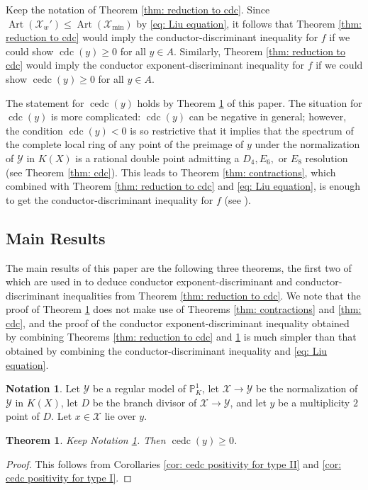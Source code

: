 \documentclass[12pt]{amsart}
\numberwithin{equation}{section}
\newtheorem{theorem}[equation]{Theorem}
\theoremstyle{definition}
\newtheorem{notation}[equation]{Notation}
\renewcommand{\P}{\mathbb P}
\newcommand{\X}{\mathcal{X}}
\newcommand{\Y}{\mathcal{Y}}
\DeclareMathOperator{\Art}{Art}
\DeclareMathOperator{\cdc}{cdc}
\DeclareMathOperator{\cedc}{cedc}
\begin{document}
Keep the notation of Theorem \ref{thm: reduction to cdc}. Since $\Art(\X_w')\leq\Art(\X_{\min})$ by \eqref{eq: Liu equation}, it follows that Theorem \ref{thm: reduction to cdc} would imply the conductor-discriminant inequality for $f$ if we could show $\cdc(y)\geq0$ for all $y\in A$. Similarly,  Theorem \ref{thm: reduction to cdc} would imply the conductor exponent-discriminant inequality for $f$ if we could show $\cedc(y)\geq0$ for all $y\in A$.

The statement for $\cedc(y)$ holds by Theorem \ref{thm: cedc} of this paper. The situation for $\cdc(y)$ is more complicated: $\cdc(y)$ can be negative in general; however, the condition $\cdc(y)<0$ is so restrictive that it implies that the spectrum of the complete local ring of any point of the preimage of $y$ under the normalization of $\Y$ in $K(X)$ is a rational double point admitting a $D_4,E_6,$ or $E_8$ resolution (see Theorem \ref{thm: cdc}). This leads to Theorem \ref{thm: contractions}, which combined with Theorem \ref{thm: reduction to cdc} and \eqref{eq: Liu equation}, is enough to get the conductor-discriminant inequality for $f$ (see \cite[Proposition 10.19 and Corollary 10.20]{Part1}).

\subsection{Main Results}\hfill

The main results of this paper are the following three theorems, the first two of which are used in \cite{Part1} to deduce conductor exponent-discriminant and conductor-discriminant inequalities from Theorem \ref{thm: reduction to cdc}. We note that the proof of Theorem \ref{thm: cedc} does not make use of Theorems \ref{thm: contractions} and \ref{thm: cdc}, and the proof of the conductor exponent-discriminant inequality obtained by combining Theorems \ref{thm: reduction to cdc} and \ref{thm: cedc} is much simpler than that obtained by combining the conductor-discriminant inequality and \eqref{eq: Liu equation}.

\begin{notation}\label{notation: intro notation}
    Let $\Y$ be a regular model of $\P^1_K$, let $\X\to\Y$ be the normalization of $\Y$ in $K(X)$, let $D$ be the branch divisor of $\X\to\Y$, and let $y$ be a multiplicity $2$ point of $D$. Let $x\in\X$ lie over $y$.
\end{notation}

\begin{theorem}\label{thm: cedc}
    Keep Notation \ref{notation: intro notation}. Then $\cedc(y)\geq0$.
\end{theorem}
\begin{proof}
    This follows from Corollaries \ref{cor: cedc positivity for type II} and \ref{cor: cedc positivity for type I}.
\end{proof}
\end{document}
